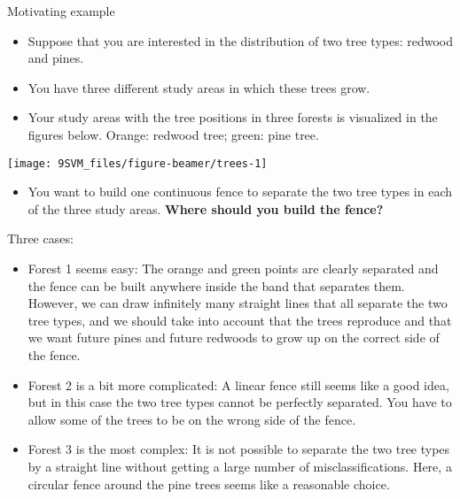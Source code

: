 \documentclass[10pt,ignorenonframetext,]{beamer}
\providecommand{\tightlist}{%
  \setlength{\itemsep}{0pt}\setlength{\parskip}{0pt}}
\begin{document}
\begin{frame}

\begin{block}{Motivating example}

\begin{itemize}
\item
  Suppose that you are interested in the distribution of two tree types:
  redwood and pines.
\item
  You have three different study areas in which these trees grow.
\item
  Your study areas with the tree positions in three forests is
  visualized in the figures below. Orange: redwood tree; green: pine
  tree.
\end{itemize}

\begin{center}\texttt{[image: 9SVM\_files/figure-beamer/trees-1]} \end{center}

\vspace{-4mm}

\begin{itemize}
\tightlist
\item
  You want to build one continuous fence to separate the two tree types
  in each of the three study areas. \textbf{Where should you build the
  fence?}
\end{itemize}

\end{block}

\end{frame}

\begin{frame}

Three cases: \vspace{2mm}

\begin{itemize}
\item
  Forest 1 seems easy: The orange and green points are clearly separated
  and the fence can be built anywhere inside the band that separates
  them. However, we can draw infinitely many straight lines that all
  separate the two tree types, and we should take into account that the
  trees reproduce and that we want future pines and future redwoods to
  grow up on the correct side of the fence.
\item
  Forest 2 is a bit more complicated: A linear fence still seems like a
  good idea, but in this case the two tree types cannot be perfectly
  separated. You have to allow some of the trees to be on the wrong side
  of the fence.
\item
  Forest 3 is the most complex: It is not possible to separate the two
  tree types by a straight line without getting a large number of
  misclassifications. Here, a circular fence around the pine trees seems
  like a reasonable choice.
\end{itemize}

\end{frame}
\end{document}
